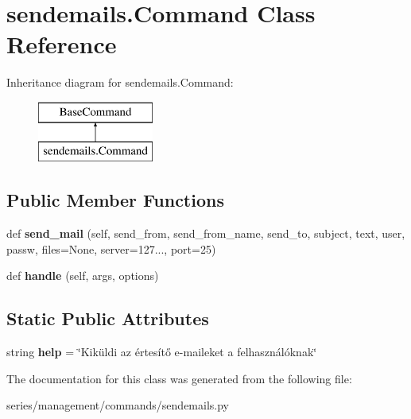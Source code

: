 \hypertarget{classsendemails_1_1_command}{}\section{sendemails.\+Command Class Reference}
\label{classsendemails_1_1_command}
Inheritance diagram for sendemails.\+Command\+:\begin{figure}[H]
\begin{center}
\leavevmode
\includegraphics[height=2.000000cm]{classsendemails_1_1_command}
\end{center}
\end{figure}
\subsection*{Public Member Functions}
\begin{DoxyCompactItemize}
\item 
\mbox{\label{classsendemails_1_1_command_a83c726f52fcf9e2bb3653fe8decdc14e}} 
def {\bfseries send\+\_\+mail} (self, send\+\_\+from, send\+\_\+from\+\_\+name, send\+\_\+to, subject, text, user, passw, files=None, server=\textquotesingle{}127...\textquotesingle{}, port=\textquotesingle{}25\textquotesingle{})
\item 
\mbox{\label{classsendemails_1_1_command_a173a36bc6961a32e077f9fe63f5f6993}} 
def {\bfseries handle} (self, args, options)
\end{DoxyCompactItemize}
\subsection*{Static Public Attributes}
\begin{DoxyCompactItemize}
\item 
\mbox{\label{classsendemails_1_1_command_a849654fe7d06d1ae7410bae7eca4a44e}} 
string {\bfseries help} = \char`\"{}Kiküldi az értesítő e-\/maileket a felhasználóknak\char`\"{}
\end{DoxyCompactItemize}


The documentation for this class was generated from the following file\+:\begin{DoxyCompactItemize}
\item 
series/management/commands/sendemails.\+py\end{DoxyCompactItemize}
